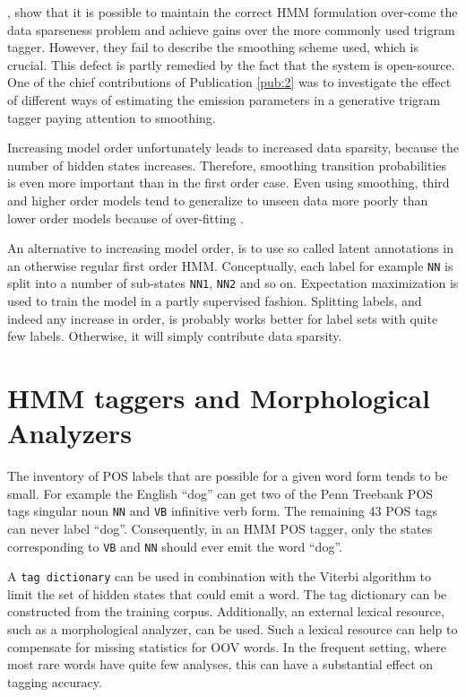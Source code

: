 \cite{Halacsy2007}, show that it is possible to maintain the correct
HMM formulation over-come the data sparseness problem and achieve
gains over the more commonly used trigram tagger. However, they fail
to describe the smoothing scheme used, which is crucial. This defect
is partly remedied by the fact that the system is open-source.  One of
the chief contributions of Publication \ref{pub:2} was to investigate
the effect of different ways of estimating the emission parameters in
a generative trigram tagger paying attention to smoothing.
 
Increasing model order unfortunately leads to increased data sparsity,
because the number of hidden states increases. Therefore, smoothing
transition probabilities is even more important than in the first
order case. Even using smoothing, third and higher order models tend
to generalize to unseen data more poorly than lower order models
because of over-fitting \citep{foo}.

An alternative to increasing model order, is to use so called latent
annotations \citep{Huang2009} in an otherwise regular first order
HMM. Conceptually, each label for example {\tt NN} is split into a
number of sub-states {\tt NN1}, {\tt NN2} and so on. Expectation
maximization is used to train the model in a partly supervised
fashion. Splitting labels, and indeed any increase in order, is
probably works better for label sets with quite few labels. Otherwise,
it will simply contribute data sparsity.


\section{HMM taggers and Morphological Analyzers}
\label{sec:hmm-label-dict}

The inventory of POS labels that are possible for a given word form
tends to be small. For example the English ``dog'' can get two of the
Penn Treebank POS tags singular noun {\tt NN} and {\tt VB} infinitive
verb form. The remaining 43 POS tags can never label
``dog''. Consequently, in an HMM POS tagger, only the states
corresponding to {\tt VB} and {\tt NN} should ever emit the word
``dog''.

A {\tt tag dictionary} \citep{Brants2000} can be used in combination
with the Viterbi algorithm to limit the set of hidden states that
could emit a word. The tag dictionary can be constructed from the
training corpus. Additionally, an external lexical resource, such as a
morphological analyzer, can be used. Such a lexical resource can help
to compensate for missing statistics for OOV words. In the frequent
setting, where most rare words have quite few analyses, this can have
a substantial effect on tagging accuracy.

